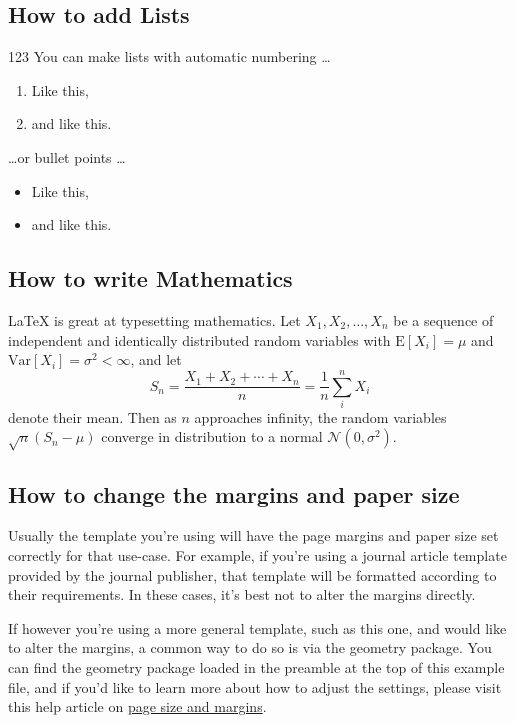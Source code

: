 \documentclass{article}
\begin{document}
\subsection{How to add Lists}
123
You can make lists with automatic numbering \dots

\begin{enumerate}
\item Like this,
\item and like this.
\end{enumerate}
\dots or bullet points \dots
\begin{itemize}
\item Like this,
\item and like this.
\end{itemize}

\subsection{How to write Mathematics}

\LaTeX{} is great at typesetting mathematics. Let $X_1, X_2, \ldots, X_n$ be a sequence of independent and identically distributed random variables with $\text{E}[X_i] = \mu$ and $\text{Var}[X_i] = \sigma^2 < \infty$, and let
\[S_n = \frac{X_1 + X_2 + \cdots + X_n}{n}
      = \frac{1}{n}\sum_{i}^{n} X_i\]
denote their mean. Then as $n$ approaches infinity, the random variables $\sqrt{n}(S_n - \mu)$ converge in distribution to a normal $\mathcal{N}(0, \sigma^2)$.


\subsection{How to change the margins and paper size}

Usually the template you're using will have the page margins and paper size set correctly for that use-case. For example, if you're using a journal article template provided by the journal publisher, that template will be formatted according to their requirements. In these cases, it's best not to alter the margins directly.

If however you're using a more general template, such as this one, and would like to alter the margins, a common way to do so is via the geometry package. You can find the geometry package loaded in the preamble at the top of this example file, and if you'd like to learn more about how to adjust the settings, please visit this help article on \href{https://www.overleaf.com/learn/latex/page_size_and_margins}{page size and margins}.
\end{document}

